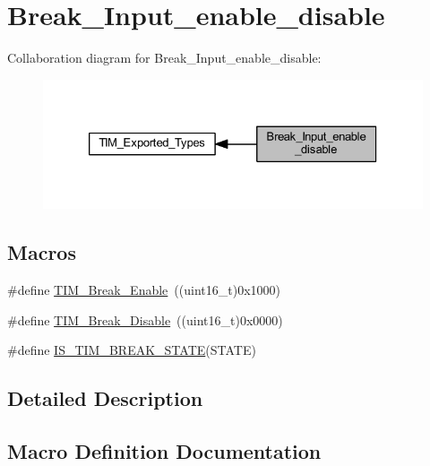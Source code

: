 \hypertarget{group___break___input__enable__disable}{}\section{Break\+\_\+\+Input\+\_\+enable\+\_\+disable}
\label{group___break___input__enable__disable}
Collaboration diagram for Break\+\_\+\+Input\+\_\+enable\+\_\+disable\+:
\nopagebreak
\begin{figure}[H]
\begin{center}
\leavevmode
\includegraphics[width=326pt]{group___break___input__enable__disable}
\end{center}
\end{figure}
\subsection*{Macros}
\begin{DoxyCompactItemize}
\item 
\#define \hyperlink{group___break___input__enable__disable_gae7fbc11ac043454b2a880bffe98fdb8c}{T\+I\+M\+\_\+\+Break\+\_\+\+Enable}~((uint16\+\_\+t)0x1000)
\item 
\#define \hyperlink{group___break___input__enable__disable_ga31ba16dd70ad4d99adc911f7bf6662e5}{T\+I\+M\+\_\+\+Break\+\_\+\+Disable}~((uint16\+\_\+t)0x0000)
\item 
\#define \hyperlink{group___break___input__enable__disable_ga29dd5484bdc69a467387bd8059b69f0e}{I\+S\+\_\+\+T\+I\+M\+\_\+\+B\+R\+E\+A\+K\+\_\+\+S\+T\+A\+TE}(S\+T\+A\+TE)
\end{DoxyCompactItemize}


\subsection{Detailed Description}


\subsection{Macro Definition Documentation}
\mbox{\label{group___break___input__enable__disable_ga29dd5484bdc69a467387bd8059b69f0e}} 

